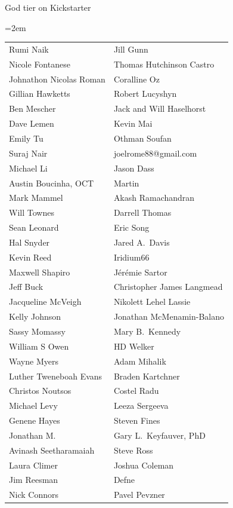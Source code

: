 God tier on Kickstarter
\begin{center}
\tabcolsep=2em
\begin{tabular}{l l}
Rumi Naik & Jill Gunn\\
Nicole Fontanese & Thomas Hutchinson Castro\\
Johnathon Nicolas Roman & Coralline Oz\\
Gillian Hawketts & Robert Lucyshyn\\
Ben Mescher & Jack and Will Haselhorst\\
Dave Lemen & Kevin Mai\\
Emily Tu & Othman Soufan\\
Suraj Nair & joelrome88@gmail.com\\
Michael Li & Jason Dass\\
Austin Boucinha, OCT & Martin\\
Mark Mammel & Akash Ramachandran\\
Will Townes & Darrell Thomas\\
Sean Leonard & Eric Song\\
Hal Snyder & Jared A.~Davis\\
Kevin Reed & Iridium66\\
Maxwell Shapiro & Jérémie Sartor\\
Jeff Buck & Christopher James Langmead\\
Jacqueline McVeigh & Nikolett Lehel Lassie\\
Kelly Johnson & Jonathan McMenamin-Balano\\
Sassy Momassy & Mary B.~Kennedy\\
William S Owen & HD Welker\\
Wayne Myers & Adam Mihalik\\
Luther Tweneboah Evans & Braden Kartchner\\
Christos Noutsos & Costel Radu\\
Michael Levy & Leeza Sergeeva\\
Genene Hayes & Steven Fines\\
Jonathan M. & Gary L.~Keyfauver, PhD\\
Avinash Seetharamaiah & Steve Ross\\
Laura Climer & Joshua Coleman\\
Jim Reesman & Defne\\
Nick Connors & Pavel Pevzner\\
\end{tabular}
\end{center}

